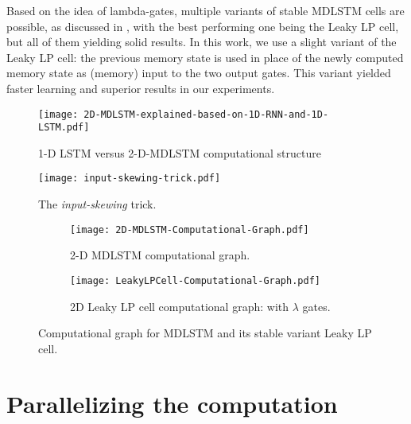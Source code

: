\documentclass[conference]{IEEEtran}
\renewcommand{\ac}[1]{\gls{#1}}
\begin{document}
Based on the idea of lambda-gates, multiple variants of stable \ac{MDLSTM} cells are possible, as discussed in \cite{LeifertEtAl2014}, with the best performing 
one being the Leaky LP cell, but all of them yielding solid results. In this work, we use a slight variant of the Leaky LP cell: 
the previous memory state is used in place of the newly computed memory state as (memory) input to the two output gates. 
This variant yielded faster learning and superior results in our experiments.



\begin{figure*}[!htb]
\begin{center}
\begin{minipage}{.54\textwidth}
  \texttt{[image: 2D-MDLSTM-explained-based-on-1D-RNN-and-1D-LSTM.pdf]}
 \caption{1-D LSTM versus 2-D-MDLSTM computational structure}
\label{figure:2dmdlstm-explained-from-1d}
\end{minipage}
\begin{minipage}{.42\textwidth}
  \texttt{[image: input-skewing-trick.pdf]}
 \caption{The \emph{input-skewing} trick.} 
\label{figure:input-skewing-trick}
\end{minipage}
\end{center}
\end{figure*}


\begin{figure*}
\begin{center}
\hspace{-2cm}
\begin{subfigure}[b]{0.37\textwidth}
  \texttt{[image: 2D-MDLSTM-Computational-Graph.pdf]}
 \caption{2-D MDLSTM computational graph.}
\label{figure:2dmdlstm-compuational-graph}
\end{subfigure}
\hspace{2.5cm}
\begin{subfigure}[b]{0.37\textwidth}
 \texttt{[image: LeakyLPCell-Computational-Graph.pdf]}
 \caption{2D Leaky LP cell computational graph: with $\lambda$ gates.}
\label{figure:leaky-lp-cell-compuational-graph} 
\end{subfigure}
\caption{Computational graph for \ac{MDLSTM} and its stable variant Leaky LP cell.}
\end{center}
\end{figure*}



\section{Parallelizing the computation}
\end{document}
